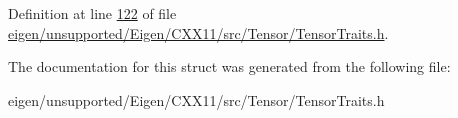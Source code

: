 Definition at line \hyperlink{eigen_2unsupported_2_eigen_2_c_x_x11_2src_2_tensor_2_tensor_traits_8h_source_l00122}{122} of file \hyperlink{eigen_2unsupported_2_eigen_2_c_x_x11_2src_2_tensor_2_tensor_traits_8h_source}{eigen/unsupported/\+Eigen/\+C\+X\+X11/src/\+Tensor/\+Tensor\+Traits.\+h}.



The documentation for this struct was generated from the following file\+:\begin{DoxyCompactItemize}
\item 
eigen/unsupported/\+Eigen/\+C\+X\+X11/src/\+Tensor/\+Tensor\+Traits.\+h\end{DoxyCompactItemize}

